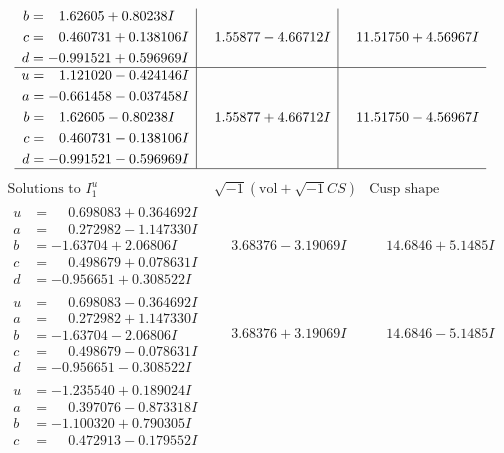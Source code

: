 \documentclass[1p]{elsarticle_modified}
\theoremstyle{definition}
\newcommand{\I}{\sqrt{-1}}
\begin{document}
$$\begin{array}{c|c|c}
\begin{aligned}
b &= \phantom{-}1.62605 + 0.80238 I \\
c &= \phantom{-}0.460731 + 0.138106 I \\
d &= -0.991521 + 0.596969 I\end{aligned}
 & \phantom{-}1.55877 - 4.66712 I & \phantom{-}11.51750 + 4.56967 I \\ \hline\begin{aligned}
u &= \phantom{-}1.121020 - 0.424146 I \\
a &= -0.661458 - 0.037458 I \\
b &= \phantom{-}1.62605 - 0.80238 I \\
c &= \phantom{-}0.460731 - 0.138106 I \\
d &= -0.991521 - 0.596969 I\end{aligned}
 & \phantom{-}1.55877 + 4.66712 I & \phantom{-}11.51750 - 4.56967 I\\
 \hline 
 \end{array}$$\newpage$$\begin{array}{c|c|c}  
\text{Solutions to }I^u_{1}& \I (\text{vol} + \sqrt{-1}CS) & \text{Cusp shape}\\
 \hline 
\begin{aligned}
u &= \phantom{-}0.698083 + 0.364692 I \\
a &= \phantom{-}0.272982 - 1.147330 I \\
b &= -1.63704 + 2.06806 I \\
c &= \phantom{-}0.498679 + 0.078631 I \\
d &= -0.956651 + 0.308522 I\end{aligned}
 & \phantom{-}3.68376 - 3.19069 I & \phantom{-}14.6846 + 5.1485 I \\ \hline\begin{aligned}
u &= \phantom{-}0.698083 - 0.364692 I \\
a &= \phantom{-}0.272982 + 1.147330 I \\
b &= -1.63704 - 2.06806 I \\
c &= \phantom{-}0.498679 - 0.078631 I \\
d &= -0.956651 - 0.308522 I\end{aligned}
 & \phantom{-}3.68376 + 3.19069 I & \phantom{-}14.6846 - 5.1485 I \\ \hline\begin{aligned}
u &= -1.235540 + 0.189024 I \\
a &= \phantom{-}0.397076 - 0.873318 I \\
b &= -1.100320 + 0.790305 I \\
c &= \phantom{-}0.472913 - 0.179552 I \\

\end{aligned}
\end{array}$$
\end{document}
